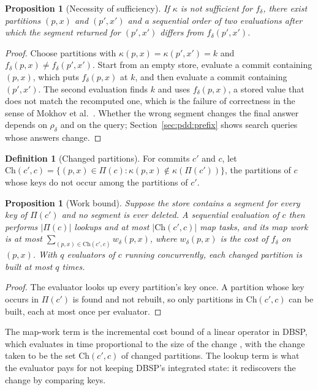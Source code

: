 \documentclass[11pt,letterpaper]{article}
\newtheorem{proposition}[theorem]{Proposition}
\theoremstyle{definition}
\newtheorem{definition}[theorem]{Definition}
\theoremstyle{remark}
\newcommand{\Ch}{\mathrm{Ch}}
\begin{document}
\begin{proposition}[Necessity of sufficiency]
\label{prop:pdd:necessity}
If $\kappa$ is not sufficient for $f_\delta$, there exist partitions $(p,x)$ and $(p',x')$ and a sequential order of two evaluations after which the segment returned for $(p',x')$ differs from $f_\delta(p',x')$.
\end{proposition}

\begin{proof}
Choose partitions with $\kappa(p,x)=\kappa(p',x')=k$ and $f_\delta(p,x)\ne f_\delta(p',x')$. Start from an empty store, evaluate a commit containing $(p,x)$, which puts $f_\delta(p,x)$ at $k$, and then evaluate a commit containing $(p',x')$. The second evaluation finds $k$ and uses $f_\delta(p,x)$, a stored value that does not match the recomputed one, which is the failure of correctness in the sense of Mokhov et al.\ \cite[Definition~3.1]{mokhov2018build}.
Whether the wrong segment changes the final answer depends on $\rho_\delta$ and on the query; Section~\ref{sec:pdd:prefix} shows search queries whose answers change.
\end{proof}

\begin{definition}[Changed partitions]
\label{def:pdd:changed}
For commits $c'$ and $c$, let $\Ch(c',c)=\{(p,x)\in\Pi(c):\kappa(p,x)\notin\kappa(\Pi(c'))\}$, the partitions of $c$ whose keys do not occur among the partitions of $c'$.
\end{definition}

\begin{proposition}[Work bound]
\label{prop:pdd:cost}
Suppose the store contains a segment for every key of $\Pi(c')$ and no segment is ever deleted. A sequential evaluation of $c$ then performs $|\Pi(c)|$ lookups and at most $|\Ch(c',c)|$ map tasks, and its map work is at most $\sum_{(p,x)\in\Ch(c',c)}w_\delta(p,x)$, where $w_\delta(p,x)$ is the cost of $f_\delta$ on $(p,x)$. With $q$ evaluators of $c$ running concurrently, each changed partition is built at most $q$ times.
\end{proposition}

\begin{proof}
The evaluator looks up every partition's key once. A partition whose key occurs in $\Pi(c')$ is found and not rebuilt, so only partitions in $\Ch(c',c)$ can be built, each at most once per evaluator.
\end{proof}

The map-work term is the incremental cost bound of a linear operator in DBSP, which evaluates in time proportional to the size of the change \cite[Section~4.4]{budiu2023dbsp}, with the change taken to be the set $\Ch(c',c)$ of changed partitions. The lookup term is what the evaluator pays for not keeping DBSP's integrated state: it rediscovers the change by comparing keys.
\end{document}
